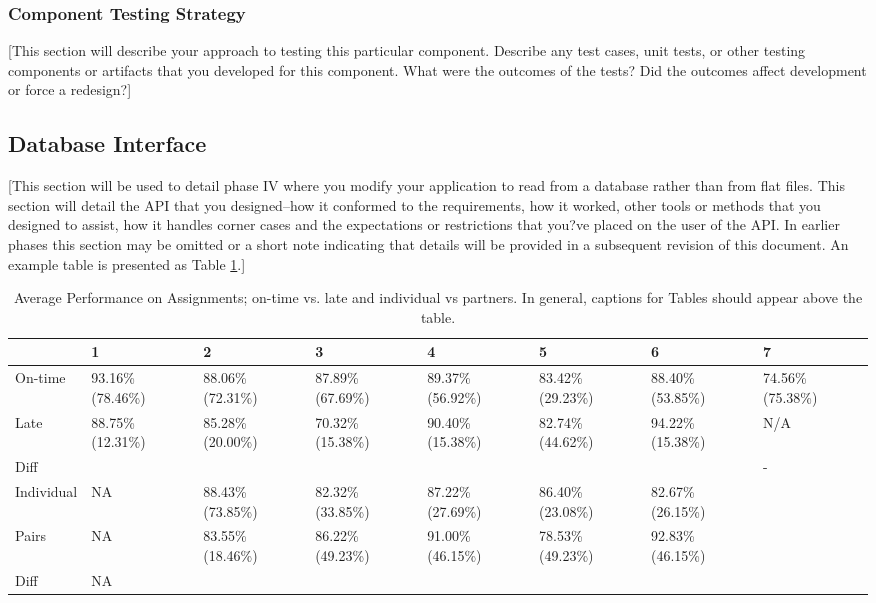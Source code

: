 \documentclass[12pt]{scrartcl} %
\begin{document}
\subsubsection{Component Testing Strategy}

[This section will describe your approach to testing this particular component.  Describe any test cases, unit tests, or other testing components or artifacts that you developed for this component.  What were the outcomes of the tests?  Did the outcomes affect development or force a redesign?]

\subsection{Database Interface}

[This section will be used to detail phase IV where you modify your application to read from a database rather than from flat files.  This section will detail the API that you designed--how it conformed to the requirements, how it worked, other tools or methods that you designed to assist, how it handles corner cases and the expectations or restrictions that you?ve placed on the user of the API.  In earlier phases this section may be omitted or a short note indicating that details will be provided in a subsequent revision of this document.  An example table is presented
as Table \ref{table:assignmentPerformance}.]

\begin{table}
\centering
\caption{Average Performance on Assignments; on-time vs. late and individual vs partners.  In general, captions for Tables should appear above the table.}
\label{table:assignmentPerformance}
\begin{tabular}{|l|p{1.5cm}|p{1.5cm}|p{1.5cm}|p{1.5cm}|p{1.5cm}|p{1.5cm}|p{1.5cm}|}
\hline
~ & 1 & 2 & 3 & 4 & 5 & 6 & 7 \\
\hline
On-time	& 93.16\% (78.46\%)	& 88.06\% (72.31\%)	& 87.89\% (67.69\%)	& 89.37\% (56.92\%) & 83.42\% (29.23\%) & 88.40\% (53.85\%) & 74.56\% (75.38\%) \\
\hline
Late & 88.75\% (12.31\%) & 85.28\% (20.00\%) & 70.32\% (15.38\%) & 90.40\% (15.38\%) & 82.74\% (44.62\%) & 94.22\% (15.38\%) & N/A \\
\hline
Diff & \color{red}{4.42\%} & \color{red}{2.79\%} & \color{red}{17.57\%} & \color{green}{1.03\%} & \color{red}{0.68\%} & \color{green}{5.82\%} & - \\
\hline
Individual & NA	& 88.43\% (73.85\%) & 82.32\% (33.85\%) & 87.22\% (27.69\%) & 86.40\% (23.08\%) & 82.67\% (26.15\%) & ~\\
\hline
Pairs & NA & 83.55\% (18.46\%) & 86.22\% (49.23\%) & 91.00\% (46.15\%) & 78.53\% (49.23\%) & 92.83\% (46.15\%) & ~\\
\hline
Diff & NA & \color{red}{4.88\%} & \color{green}{3.90\%} & \color{green}{3.78\%} & \color{red}{7.87\%} & \color{green}{10.16\%}	& ~\\
\hline
\end{tabular}
\end{table}
\end{document}
